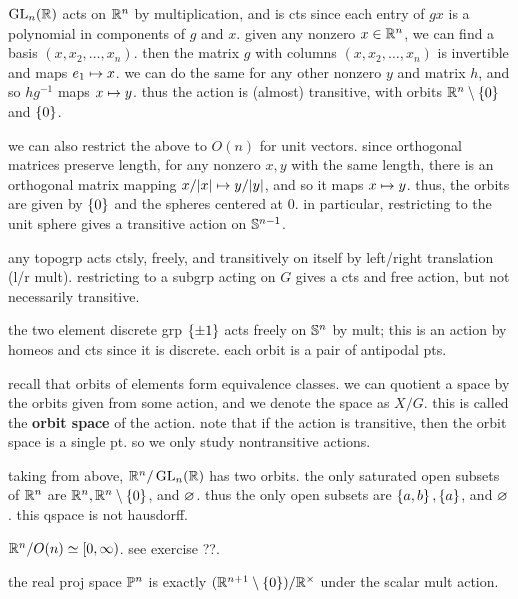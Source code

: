 \begin{xmp}[source=Primary Source Material]
    $\operatorname{GL}_{n}(\mathbb{R})$ acts on $\mathbb{R}^{n}$ by multiplication, and is cts since each
    entry of $gx$ is a polynomial in components of $g$ and $x$. given any
    nonzero $x\in\mathbb{R}^{n}$, we can find a basis $(x,x_{2},\dots,x_{n})$. then the
    matrix $g$ with columns $(x,x_{2},\dots,x_{n})$ is invertible and maps
    $e_{1}\mapsto x$. we can do the same for any other nonzero $y$ and matrix $h$,
    and so $hg^{-1}$ maps $x\mapsto y$. thus the action is (almost) transitive, with
    orbits $\mathbb{R}^{n}\setminus\left\{{0}\right\}$ and $\left\{{0}\right\}$.

    we can also restrict the above to $O(n)$ for unit vectors. since orthogonal
    matrices preserve length, for any nonzero $x,y$ with the same length, there
    is an orthogonal matrix mapping $x/\abs{x}\mapsto y/\abs{y}$, and so it maps
    $x \mapsto y$. thus, the orbits are given by $\left\{{0}\right\}$ and the spheres centered
    at $0$. in particular, restricting to the unit sphere gives a transitive
    action on $\mathbb{S}^{n-1}$.

    any topogrp acts ctsly, freely, and transitively on itself by left/right
    translation (l/r mult). restricting to a subgrp acting on $G$ gives a cts and
    free action, but not necessarily transitive.

    the two element discrete grp $\left\{{\pm1}\right\}$ acts freely on $\mathbb{S}^{n}$ by
    mult; this is an action by homeos and cts since it is discrete. each orbit is
    a pair of antipodal pts.
\end{xmp}
recall that orbits of elements form equivalence classes. we can quotient a space
by the orbits given from some action, and we denote the space as $X/G$. this is
called the \textbf{orbit space} of the action. note that if the action is
transitive, then the orbit space is a single pt. so we only study nontransitive
actions.

\newpage
\begin{xmp}[source=Primary Source Material]
    taking from above, $\mathbb{R}^{n}/\operatorname{GL}_{n}(\mathbb{R})$ has two orbits. the only
    saturated open subsets of $\mathbb{R}^{n}$ are $\mathbb{R}^{n},\mathbb{R}^{n}\setminus\left\{{0}\right\}$,
    and $\varnothing$. thus the only open subsets are $\left\{{a,b}\right\},\left\{{a}\right\}$, and $\varnothing$.
    this qspace is not hausdorff.

    $\mathbb{R}^{n}/O(n)\simeq[0,\infty)$. see exercise ??.

    the real proj space $\mathbb{P}^{n}$ is exactly
    $(\mathbb{R}^{n+1}\setminus\left\{{0}\right\})/\mathbb{R}^{\times}$ under the scalar mult action.
\end{xmp}


